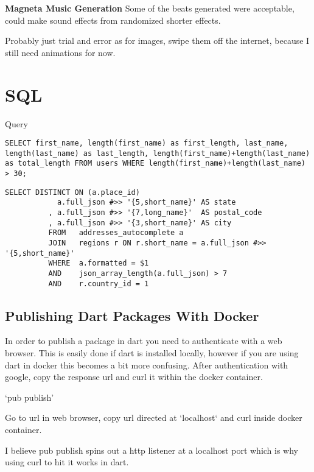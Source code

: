 
\textbf{Magneta Music Generation} Some of the beats generated were acceptable, could make sound effects from randomized shorter effects.

Probably just trial and error as for images, swipe them off the internet, because I still need animations for now.


\section{SQL}

Query
\begin{lstlisting}[caption={SQL Query for length}]
SELECT first_name, length(first_name) as first_length, last_name, length(last_name) as last_length, length(first_name)+length(last_name) as total_length FROM users WHERE length(first_name)+length(last_name) > 30;
\end{lstlisting}

\begin{lstlisting}[caption={SQL Query for addresses}]
SELECT DISTINCT ON (a.place_id)
            a.full_json #>> '{5,short_name}' AS state
          , a.full_json #>> '{7,long_name}'  AS postal_code
          , a.full_json #>> '{3,short_name}' AS city
          FROM   addresses_autocomplete a
          JOIN   regions r ON r.short_name = a.full_json #>> '{5,short_name}'
          WHERE  a.formatted = $1
          AND    json_array_length(a.full_json) > 7
          AND    r.country_id = 1
\end{lstlisting}

\subsection{Publishing Dart Packages With Docker}

In order to publish a package in dart you need to authenticate with a web browser. This is easily done if dart is installed locally, however if you are using dart in docker this becomes a bit more confusing.
After authentication with google, copy the response url and curl it within the docker container.

`pub publish'

Go to url in web browser, copy url directed at `localhost` and curl inside docker container.

I believe pub publish spins out a http listener at a localhost port which is why using curl to hit it works in dart.


